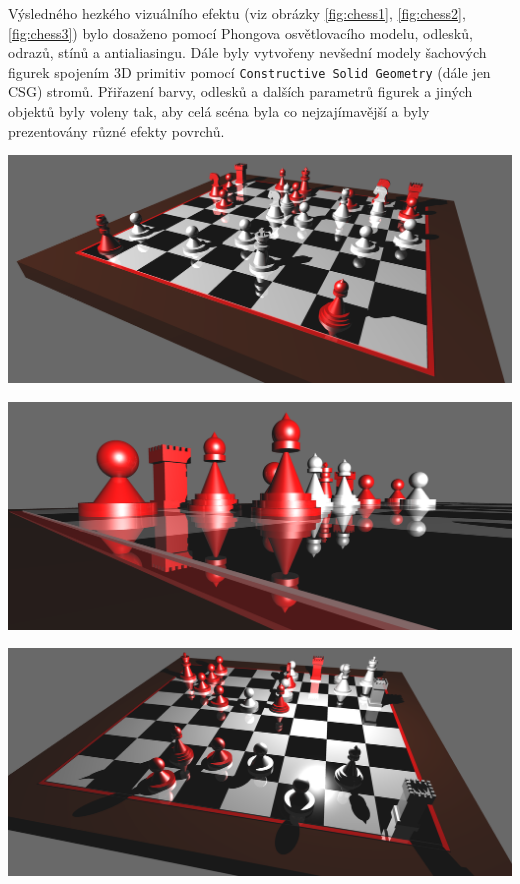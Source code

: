 \documentclass[12pt,a4paper,titlepage,final]{report}
\begin{document}
Výsledného hezkého vizuálního efektu (viz obrázky \ref{fig:chess1}, \ref{fig:chess2}, \ref{fig:chess3}) bylo dosaženo pomocí Phongova osvětlovacího modelu, odlesků, odrazů, stínů a antialiasingu. Dále byly vytvořeny nevšední modely šachových figurek spojením 3D primitiv pomocí \texttt{Constructive Solid Geometry} (dále jen CSG) stromů. Přiřazení barvy, odlesků a dalších parametrů figurek a jiných objektů byly voleny tak, aby celá scéna byla co nejzajímavější a byly prezentovány různé efekty povrchů.

\begin{center}
	\captionsetup{type=figure}
		\includegraphics[width=0.8\linewidth]{images/scene1.png}
	\label{fig:chess1}
\end{center}

\begin{center}
	\captionsetup{type=figure}
	\includegraphics[width=0.8\linewidth]{images/scene2.png}
	\label{fig:chess2}
\end{center}

\begin{center}
	\captionsetup{type=figure}
	\includegraphics[width=0.8\linewidth]{images/scene3.png}
	\label{fig:chess3}
\end{center}
\end{document}
